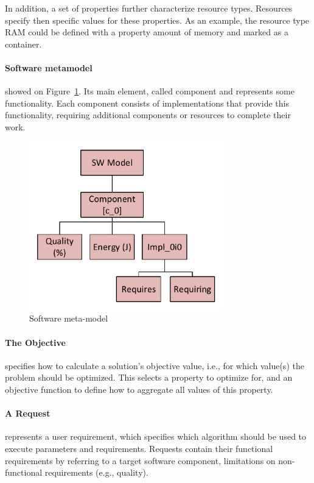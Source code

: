 In addition, a set of properties further characterize resource types. Resources specify then specific values for these properties. As an example, the resource type RAM could be defined with a property amount of memory and marked as a container.

\paragraph{Software metamodel} showed on Figure~\ref{fig:SWModel}. Its main element, called component and represents some functionality.
Each component consists of implementations that provide this functionality, requiring additional components or resources to complete their work. 

\begin{figure}
	\centering
	\includegraphics[width=0.75\textwidth]{images/SWModel}
	\caption[Software meta-model]{Software meta-model}
	\label{fig:SWModel}
\end{figure}

\paragraph{The Objective} specifies how to calculate a solution's objective value, i.e., for which value(s) the problem should be optimized. This selects a property to optimize for, and an objective function to define how to aggregate all values of this property.

\paragraph{A Request} represents a user requirement, which specifies which algorithm should be used to execute parameters and requirements. Requests contain their functional requirements by referring to a target software component, limitations on non-functional requirements (e.g., quality).\\

